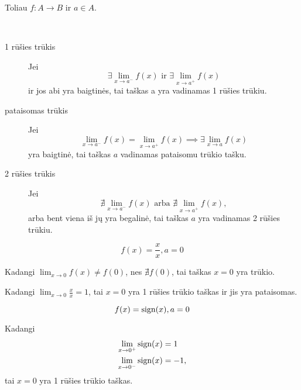 \begin{note}
  Toliau $f: A \to B$ ir $a \in A$.
\end{note}

\begin{defn}
  \hfill \\
  \begin{description}
    \item[1 rūšies trūkis] Jei 
      \begin{equation*}
        \exists \lim _{x \to a^{-}} f(x) 
        \text{ ir }
        \exists \lim _{x \to a^{+}} f(x) 
      \end{equation*}
       ir jos abi yra baigtinės, tai
      taškas a yra vadinamas 1 rūšies trūkiu.
    \item[pataisomas trūkis] Jei
      \begin{equation*}
        \lim_{x \to a^{-}} f(x) = \lim_{x \to a^{+}} f(x) 
        \implies \exists \lim_{x \to a} f(x)
      \end{equation*}
      yra baigtinė, tai taškas $a$ vadinamas pataisomu trūkio tašku.
    \item[2 rūšies trūkis] Jei
      \begin{equation*}
        \nexists \lim_{x \to a^{-}} f(x)
        \text{ arba }
        \nexists \lim_{x \to a^{+}} f(x),
      \end{equation*}
      arba bent viena iš jų yra begalinė, tai taškas $a$ yra vadinamas
      2 rūšies trūkiu.
  \end{description}
\end{defn}

\begin{exmp}
  \begin{equation*}
    f(x) = \frac{x}{x}, a = 0
  \end{equation*}

  Kadangi $\lim_{x \to 0} f(x) \neq f(0)$, nes $\nexists f(0)$, tai
  taškas $x = 0$ yra trūkio.

  Kadangi $\lim_{x \to 0} \frac{x}{x} = 1$, tai $x = 0$ yra 1 rūšies
  trūkio taškas ir jis yra pataisomas.
\end{exmp}

\begin{exmp}
  \begin{equation*}
    f(x) = \mathop{\text{sign}}(x), a = 0
  \end{equation*}

  Kadangi
  \begin{align*}
    \lim_{x \to 0^{+}} \mathop{\text{sign}}(x) &= 1 \\
    \lim_{x \to 0^{-}} \mathop{\text{sign}}(x) &= -1,
  \end{align*}
  tai $x = 0$ yra 1 rūšies trūkio taškas.
\end{exmp}

